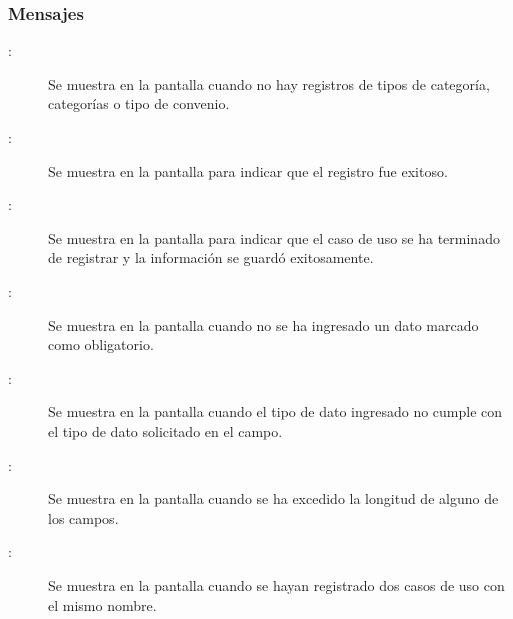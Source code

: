 \subsubsection{Mensajes}

	
\begin{description}
	\item[:] Se muestra en la pantalla  cuando no hay registros de tipos de categoría, categorías o tipo de convenio.
	\item[ :] Se muestra en la pantalla  para indicar que el registro fue exitoso.
	\item[ :] Se muestra en la pantalla  para indicar que el 
	caso de uso se ha terminado de registrar y la información se guardó exitosamente.
	\item[ :] Se muestra en la pantalla  cuando no se ha ingresado un dato marcado como obligatorio.
	\item[ :] Se muestra en la pantalla  cuando el tipo de dato ingresado no cumple con el tipo de dato solicitado en el campo.
	\item[ :] Se muestra en la pantalla  cuando se ha excedido la longitud de alguno de los campos.
	\item[ :] Se muestra en la pantalla  cuando se hayan registrado dos casos de uso con el mismo nombre.
	
\end{description}
